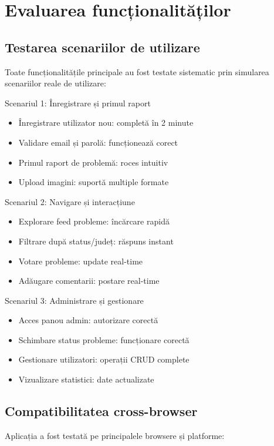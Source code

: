 \documentclass[12pt,a4paper]{report}
\begin{document}
\section{Evaluarea funcționalităților}

\subsection{Testarea scenariilor de utilizare}

Toate funcționalitățile principale au fost testate sistematic prin simularea scenariilor reale de utilizare:

Scenariul 1: Înregistrare și primul raport
\begin{itemize}
\item Înregistrare utilizator nou: completă în 2 minute
\item Validare email și parolă: funcționează corect
\item Primul raport de problemă: roces intuitiv
\item Upload imagini: suportă multiple formate
\end{itemize}

Scenariul 2: Navigare și interacțiune
\begin{itemize}
\item Explorare feed probleme: încărcare rapidă
\item Filtrare după status/județ: răspuns instant
\item Votare probleme: update real-time
\item Adăugare comentarii: postare real-time
\end{itemize}

Scenariul 3: Administrare și gestionare
\begin{itemize}
\item Acces panou admin: autorizare corectă
\item Schimbare status probleme: funcționare corectă
\item Gestionare utilizatori: operații CRUD complete
\item Vizualizare statistici: date actualizate
\end{itemize}

\subsection{Compatibilitatea cross-browser}

Aplicația a fost testată pe principalele browsere și platforme:
\end{document}
